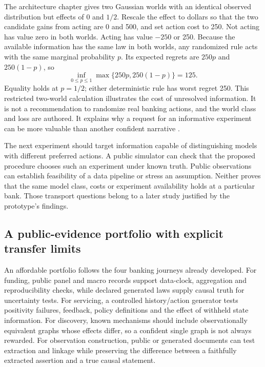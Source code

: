 The architecture chapter gives two Gaussian worlds with an identical observed
distribution but effects of 0 and $1/2$. Rescale the effect to dollars so that
the two candidate gains from acting are 0 and 500, and set action cost to 250.
Not acting has value zero in both worlds. Acting has value $-250$ or 250.
Because the available information has the same law in both worlds, any
randomized rule acts with the same marginal probability $p$. Its expected
regrets are $250p$ and $250(1-p)$, so
\begin{equation}
 \inf_{0\leq p\leq1}\max\{250p,250(1-p)\}=125.
 \label{exec13:frontier-minimax}
\end{equation}
Equality holds at $p=1/2$; either deterministic rule has worst regret 250.
This restricted two-world calculation illustrates the cost of unresolved
information. It is not a recommendation to randomize real banking actions,
and the world class and loss are authored. It explains why a request for an
informative experiment can be more valuable than another confident narrative
\cite{exec13_architecture_exact,exec13_frontier_exact}.

The next experiment should target information capable of distinguishing models
with different preferred actions. A public simulator can check that the
proposed procedure chooses such an experiment under known truth. Public
observations can establish feasibility of a data pipeline or stress an
assumption. Neither proves that the same model class, costs or experiment
availability holds at a particular bank. Those transport questions belong to
a later study justified by the prototype's findings.

\subsection{A public-evidence portfolio with explicit transfer limits}

An affordable portfolio follows the four banking journeys already developed.
For funding, public panel and macro records support data-clock, aggregation
and reproducibility checks, while declared generated laws supply causal truth
for uncertainty tests. For servicing, a controlled history/action generator
tests positivity failures, feedback, policy definitions and the effect of
withheld state information. For discovery, known mechanisms should include
observationally equivalent graphs whose effects differ, so a confident single
graph is not always rewarded. For observation construction, public or generated
documents can test extraction and linkage while preserving the difference
between a faithfully extracted assertion and a true causal statement.

